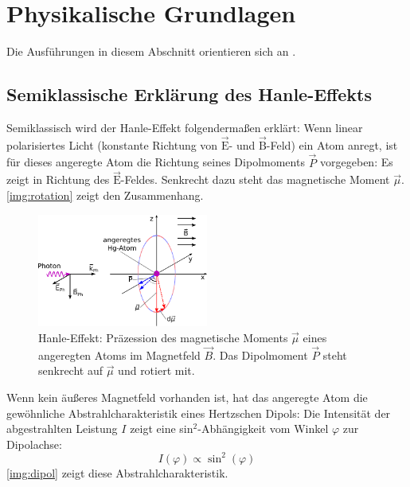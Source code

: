 \section{Physikalische Grundlagen}
Die Ausführungen in diesem Abschnitt orientieren sich an \cite{manual}.

\subsection{Semiklassische Erklärung des Hanle-Effekts}

Semiklassisch wird der Hanle-Effekt folgendermaßen erklärt:
Wenn linear polarisiertes Licht (konstante Richtung von $\vec{\text{E}}$- und $\vec{\text{B}}$-Feld)
ein Atom anregt, ist für dieses angeregte Atom die Richtung seines Dipolmoments $\vec{P}$ vorgegeben:
Es zeigt in Richtung des $\vec{\text{E}}$-Feldes. Senkrecht dazu steht das magnetische Moment $\vec{\mu}$.
\autoref{img:rotation} zeigt den Zusammenhang.\\

\begin{figure}[H]
\begin{center}
  \includegraphics[width=0.5\textwidth]{../img/rotation.pdf}
  \caption{Hanle-Effekt: Präzession des magnetische Moments $\vec{\mu}$ eines angeregten Atoms im
  Magnetfeld $\vec{B}$. Das Dipolmoment $\vec{P}$ steht senkrecht auf $\vec{\mu}$ und rotiert mit.}
  \label{img:rotation}
\end{center}
\end{figure}

Wenn kein äußeres Magnetfeld vorhanden ist,
hat das angeregte Atom die gewöhnliche Abstrahlcharakteristik eines Hertzschen Dipols:
Die Intensität der abgestrahlten Leistung $I$ zeigt eine sin$^2$-Abhängigkeit vom Winkel $\varphi$ zur
Dipolachse:
\begin{equation}
\label{eq:hertz}
I(\varphi) \propto \sin^2(\varphi)
\end{equation} 
\autoref{img:dipol} zeigt diese Abstrahlcharakteristik.

